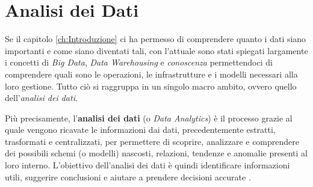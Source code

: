 \section{Analisi dei Dati}

Se il capitolo \ref{ch:Introduzione} ci ha permesso di comprendere quanto i dati siano importanti e come siano diventati tali, con l'attuale sono stati spiegati largamente i concetti di \textit{Big Data}, \textit{Data Warehousing} e \textit{conoscenza} permettendoci di comprendere quali sono le operazioni, le infrastrutture e i modelli necessari alla loro gestione. Tutto ciò si raggruppa in un singolo macro ambito, ovvero quello dell'\textit{analisi dei dati}.

Più precisamente, l'\textbf{analisi dei dati} (o \textit{Data Analytics}) è il processo grazie al quale vengono ricavate le informazioni dai dati, precedentemente estratti, trasformati e centralizzati, per permettere di scoprire, analizzare e comprendere dei possibili schemi (o modelli) nascosti, relazioni, tendenze e anomalie presenti al loro interno. L'obiettivo dell'analisi dei dati è quindi identificare informazioni utili, suggerire conclusioni e aiutare a prendere decisioni accurate \cite{talend_data_analytics}.

